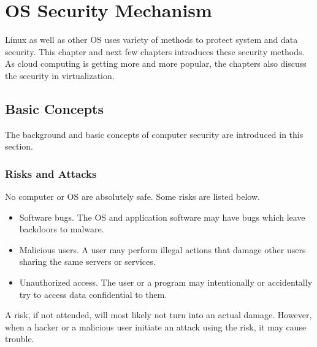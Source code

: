 \chapter{OS Security Mechanism}

Linux as well as other OS uses variety of methods to protect system and data security. This chapter and next few chapters introduces these security methods. As cloud computing is getting more and more popular, the chapters also discuss the security in virtualization.

\section{Basic Concepts}

The background and basic concepts of computer security are introduced in this section.

\subsection{Risks and Attacks}

No computer or OS are absolutely safe. Some risks are listed below.
\begin{itemize}
	\item Software bugs. The OS and application software may have bugs which leave backdoors to malware.
	\item Malicious users. A user may perform illegal actions that damage other users sharing the same servers or services.
	\item Unauthorized access. The user or a program may intentionally or accidentally try to access data confidential to them.
\end{itemize}
A risk, if not attended, will most likely not turn into an actual damage. However, when a hacker or a malicious user initiate an attack using the risk, it may cause trouble.

